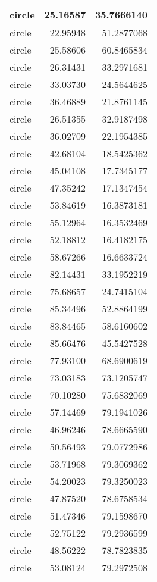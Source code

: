 \documentclass[
]{book}
\theoremstyle{definition}
\theoremstyle{definition}
\theoremstyle{definition}
\theoremstyle{definition}
\theoremstyle{remark}
\begin{document}
\begin{tabular}{l|r|r}
\hline
circle & 25.16587 & 35.7666140\\
\hline
circle & 22.95948 & 51.2877068\\
\hline
circle & 25.58606 & 60.8465834\\
\hline
circle & 26.31431 & 33.2971681\\
\hline
circle & 33.03730 & 24.5644625\\
\hline
circle & 36.46889 & 21.8761145\\
\hline
circle & 26.51355 & 32.9187498\\
\hline
circle & 36.02709 & 22.1954385\\
\hline
circle & 42.68104 & 18.5425362\\
\hline
circle & 45.04108 & 17.7345177\\
\hline
circle & 47.35242 & 17.1347454\\
\hline
circle & 53.84619 & 16.3873181\\
\hline
circle & 55.12964 & 16.3532469\\
\hline
circle & 52.18812 & 16.4182175\\
\hline
circle & 58.67266 & 16.6633724\\
\hline
circle & 82.14431 & 33.1952219\\
\hline
circle & 75.68657 & 24.7415104\\
\hline
circle & 85.34496 & 52.8864199\\
\hline
circle & 83.84465 & 58.6160602\\
\hline
circle & 85.66476 & 45.5427528\\
\hline
circle & 77.93100 & 68.6900619\\
\hline
circle & 73.03183 & 73.1205747\\
\hline
circle & 70.10280 & 75.6832069\\
\hline
circle & 57.14469 & 79.1941026\\
\hline
circle & 46.96246 & 78.6665590\\
\hline
circle & 50.56493 & 79.0772986\\
\hline
circle & 53.71968 & 79.3069362\\
\hline
circle & 54.20023 & 79.3250023\\
\hline
circle & 47.87520 & 78.6758534\\
\hline
circle & 51.47346 & 79.1598670\\
\hline
circle & 52.75122 & 79.2936599\\
\hline
circle & 48.56222 & 78.7823835\\
\hline
circle & 53.08124 & 79.2972508\\

\end{tabular}
\end{document}
